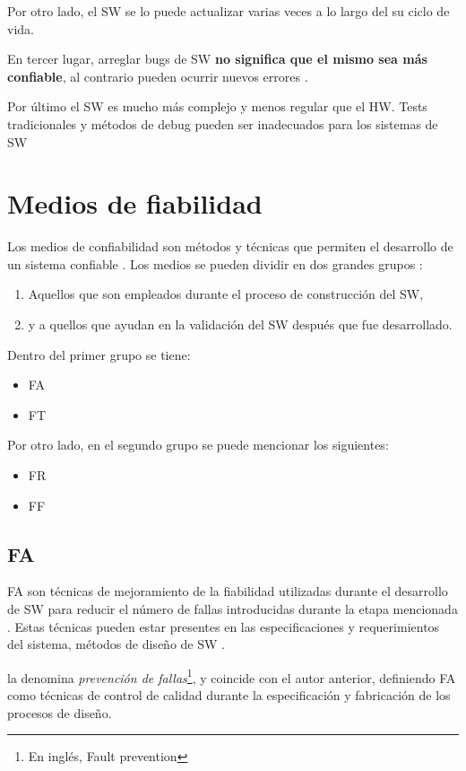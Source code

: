 Por otro lado, el \ac{SW} se lo puede actualizar varias veces a lo largo del su ciclo de vida.

En tercer lugar, arreglar bugs de \ac{SW} \textbf{no significa que el mismo sea más confiable}, al contrario pueden ocurrir nuevos errores \citep{FTDesign}.

Por último el \ac{SW} es mucho más complejo y menos regular que el \ac{HW}. Tests tradicionales y métodos de debug pueden ser inadecuados para los sistemas de \ac{SW}

\section{Medios de fiabilidad}\label{sec:medios_falla}
Los medios de confiabilidad son métodos y técnicas que permiten el desarrollo de un sistema
confiable \citep{FTDesign}. Los medios se pueden dividir en dos grandes grupos \citep{Pullum01}:
\begin{enumerate}
 \item Aquellos que son empleados durante el proceso de construcción del \ac{SW},
 \item y a quellos que ayudan en la validación del \ac{SW} después que fue desarrollado.
\end{enumerate}

Dentro del primer grupo se tiene:
\begin{itemize}
 \item \acl{FA}
 \item \acl{FT}
\end{itemize}

Por otro lado, en el segundo grupo se puede mencionar los siguientes:
\begin{itemize}
 \item \acl{FR}
 \item \acl{FF}
\end{itemize}

\subsection{\acl{FA}}
\ac{FA} son técnicas de mejoramiento de la fiabilidad utilizadas durante el desarrollo de \ac{SW}
para reducir el número de fallas introducidas durante la etapa mencionada \citep{Pullum01}. Estas
técnicas pueden estar presentes en las especificaciones y requerimientos del sistema, métodos de
diseño de \ac{SW} \citep{Pullum01}.

\cite{FTDesign} la denomina \textit{prevención de fallas}\footnote{En inglés, Fault prevention}, y
coincide con el autor anterior, definiendo \ac{FA} como técnicas de control de calidad durante la
especificación y fabricación de los procesos de diseño.

